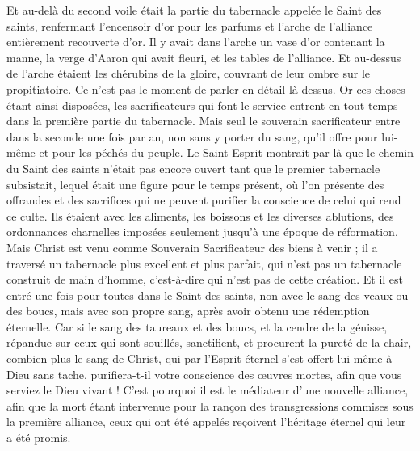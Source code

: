 \begin{multicols}{2}
Et au-delà du second voile était la partie du tabernacle appelée le Saint des saints,
renfermant l’encensoir d'or pour les parfums et l'arche de l'alliance entièrement recouverte d'or. Il y avait dans l’arche un vase d'or contenant la manne, la verge d'Aaron qui avait fleuri, et les tables de l'alliance.
Et au-dessus de l'arche étaient les chérubins de la gloire, couvrant de leur ombre sur le propitiatoire. Ce n’est pas le moment de parler en détail là-dessus.
Or ces choses étant ainsi disposées, les sacrificateurs qui font le service entrent en tout temps dans la première partie du tabernacle.
Mais seul le souverain sacrificateur entre dans la seconde une fois par an, non sans y porter du sang, qu’il offre pour lui-même et pour les péchés du peuple.
Le Saint-Esprit montrait par là que le chemin du Saint des saints n'était pas encore ouvert tant que le premier tabernacle subsistait,
lequel était une figure pour le temps présent, où l’on présente des offrandes et des sacrifices qui ne peuvent purifier la conscience de celui qui rend ce culte.
Ils étaient avec les aliments, les boissons et les diverses ablutions, des ordonnances charnelles imposées seulement jusqu’à une époque de réformation.
Mais Christ est venu comme Souverain Sacrificateur des biens à venir ; il a traversé un tabernacle plus excellent et plus parfait, qui n'est pas un tabernacle construit de main d’homme, c'est-à-dire qui n’est pas de cette création.
Et il est entré une fois pour toutes dans le Saint des saints, non avec le sang des veaux ou des boucs, mais avec son propre sang, après avoir obtenu une rédemption éternelle.
Car si le sang des taureaux et des boucs, et la cendre de la génisse, répandue sur ceux qui sont souillés, sanctifient, et procurent la pureté de la chair,
combien plus le sang de Christ, qui par l'Esprit éternel s'est offert lui-même à Dieu sans tache, purifiera-t-il votre conscience des œuvres mortes, afin que vous serviez le Dieu vivant !
C'est pourquoi il est le médiateur d’une nouvelle alliance, afin que la mort étant intervenue pour la rançon des transgressions commises sous la première alliance, ceux qui ont été appelés reçoivent l’héritage éternel qui leur a été promis.

\end{multicols}
